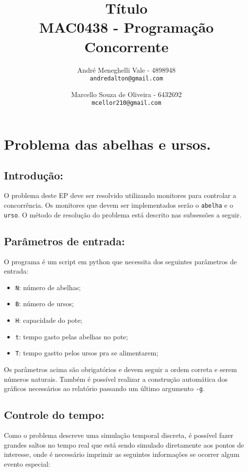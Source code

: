 \documentclass[12pt,a4paper]{article}
\title{Título\\MAC0438 - Programação Concorrente}
\author{
    André Meneghelli Vale - 4898948\\
    \texttt{andredalton@gmail.com}
    \and
    Marcello Souza de Oliveira - 6432692\\
    \texttt{mcellor210@gmail.com}
}
\date{}
\begin{document}
\maketitle

\newpage

\section{Problema das abelhas e ursos.}

\subsection{Introdução:}

O problema deste EP deve ser resolvido utilizando monitores para controlar a concorrência. Os monitores que devem ser implementados serão o \verb+abelha+ e o \verb+urso+. O método de resolução do problema está descrito nas subsessões a seguir.

\subsection{Parâmetros de entrada:}

O programa é um script em python que necessita dos seguintes parâmetros de entrada:

\begin{itemize}
\item \verb+N+: número de abelhas;
\item \verb+B+: número de ursos;
\item \verb+H+: capacidade do pote;
\item \verb+t+: tempo gasto pelas abelhas no pote;
\item \verb+T+: tempo gastto pelos ursos pra se alimentarem;
\end{itemize}

Os parâmetros acima são obrigatórios e devem seguir a ordem correta e serem números naturais. Também é possível realizar a construção automática dos gráficos necessários ao relatório passando um último argumento \verb+-g+. 

\subsection{Controle do tempo:}

Como o problema descreve uma simulação temporal discreta, é possível fazer grandes saltos no tempo real que está sendo simulado diretamente aos pontos de interesse, onde é necessário imprimir as seguintes informações se ocorrer algum evento especial:
\end{document}
